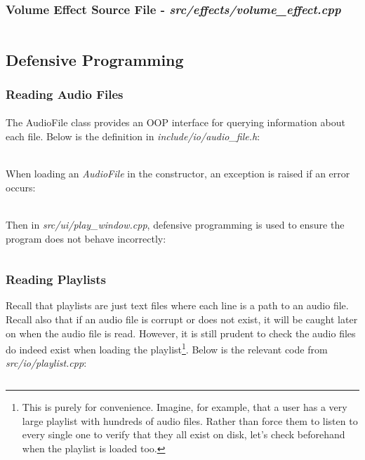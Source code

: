\subsubsection{Volume Effect Source File - \textit{src/effects/volume\_effect.cpp}}
\inputminted[linenos]{c++}{../src/effects/volume_effect.cpp}


\pagebreak
\subsection{Defensive Programming}

\subsubsection{Reading Audio Files}
\paragraph{}
The AudioFile class provides an OOP interface for querying information about each file. Below is the definition in \textit{include/io/audio\_file.h}:
\inputminted[linenos]{c++}{../include/io/audio_file.h}

\paragraph{}
When loading an \textit{AudioFile} in the constructor, an exception is raised if an error occurs:
\inputminted[linenos, firstline=4, lastline=10]{c++}{../src/io/audio_file.cpp}

\paragraph{}
Then in \textit{src/ui/play\_window.cpp},  defensive programming is used to ensure the program does not behave incorrectly:
\pagebreak
\inputminted[linenos, firstline=303, lastline=348]{c++}{../src/ui/play_window.cpp}

\pagebreak
\subsubsection{Reading Playlists}
Recall that playlists are just text files where each line is a path to an audio file. Recall also that if an audio file is corrupt or does not exist, it will be caught later on when the audio file is read. However, it is still prudent to check the audio files do indeed exist when loading the playlist\footnote{
	This is purely for convenience. Imagine, for example, that a user has a very large playlist with hundreds of audio files. Rather than force them to listen to every single one to verify that they all exist on disk, let's check beforehand when the playlist is loaded too.
}. Below is the relevant code from \textit{src/io/playlist.cpp}:
\inputminted[linenos, firstline=25, lastline=55]{c++}{../src/io/playlist.cpp}

